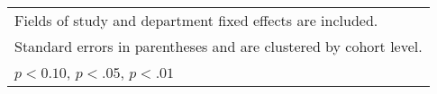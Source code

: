 \begin{table}[htbp]
\begin{adjustbox}{max width=.75\textwidth}
\begin{tabular}{l*{3}{c}}
\multicolumn{4}{l}{\footnotesize Fields of study and department fixed effects are included.}\\
\multicolumn{4}{l}{\footnotesize Standard errors in parentheses and are clustered by cohort level.}\\
\multicolumn{4}{l}{\footnotesize \sym{*} \(p<0.10\), \sym{**} \(p<.05\), \sym{***} \(p<.01\)}\\
\end{tabular}%
	\end{adjustbox}
\end{table}
